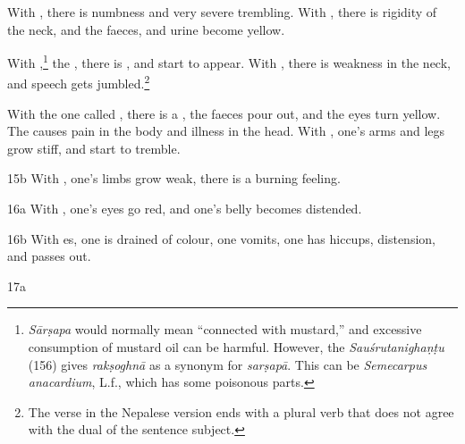 \begin{translation}
    With
    , there is numbness
    and very severe trembling.
%
    With
    , there is rigidity of the neck, and the faeces,
    and urine become yellow.
    
With ,\footnote{\emph{Sārṣapa} would normally mean
“connected with mustard,” and excessive consumption of mustard oil can be 
harmful. However, the \emph{Sauśrutanighaṇṭu} (156) gives
\emph{rakṣoghnā} as a synonym for \emph{sarṣapā}. This can be
\textit{Semecarpus anacardium}, L.f., which has some poisonous parts.} the
, there is ,
and  start to appear. %
With , there is weakness
in the neck, and speech gets jumbled.\footnote{The verse in the Nepalese version 
ends with a plural verb that does not agree with the dual of the sentence subject.}
    
    With the one called
    ,
    there is a , the faeces pour out, and  the eyes
    turn yellow.
The
causes pain in the body and illness in the head.
    With
    ,
    one's arms and legs grow stiff, and start to tremble.
    \item[ 15b]
    With
    , one's limbs grow weak, there is a burning
    feeling.
    \item[ 16a]
    With
    ,
    one's eyes go red, and one's belly becomes distended.
    \item[ 16b]
    With
    es,
    one is drained of colour, one vomits, one has hiccups, distension, and
    passes out.
    
    \item[ 17a]
        

\end{translation}
